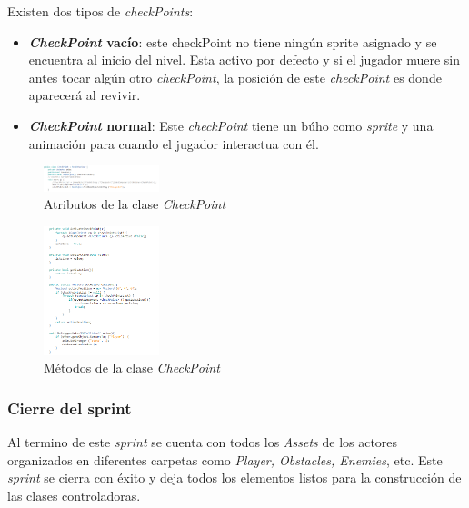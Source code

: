 Existen dos tipos de \textit{checkPoints}: 
	\begin{itemize}
		\item \textbf{\textit{CheckPoint} vacío}: este checkPoint no tiene ningún 
		sprite asignado y se encuentra al inicio del nivel. Esta activo por defecto 
		y si el jugador muere sin antes tocar algún otro \textit{checkPoint}, la 
		posición de este \textit{checkPoint} es donde aparecerá al revivir.
		\item \textbf{\textit{CheckPoint} normal}: Este \textit{checkPoint} tiene un 
		búho como \textit{sprite} y una animación para cuando el jugador interactua con 
		él.
	\end{itemize}
	
\begin{figure}[h]
    			\centering
    			\includegraphics[width=0.3\textwidth]{03TrabajoRealizado/imagenes/checkpoint.png}
    			\caption{Atributos de la clase \textit{CheckPoint}}
    			\label{fig:CheckAtri}	
\end{figure}

\begin{figure}[h]
    			\centering
    			\includegraphics[width=0.3\textwidth]{03TrabajoRealizado/imagenes/checkpointmethods.png}
    			\caption{Métodos de la clase \textit{CheckPoint}}
    			\label{fig:CheckMethod}	
\end{figure}

\subsubsection{Cierre del sprint}
Al termino de este \textit{sprint} se cuenta con todos los \textit{Assets} de 
los actores organizados en diferentes carpetas como \textit{Player, Obstacles, Enemies}, 
etc. Este \textit{sprint} se cierra con éxito y deja todos los elementos listos 
para la construcción de las clases controladoras. 